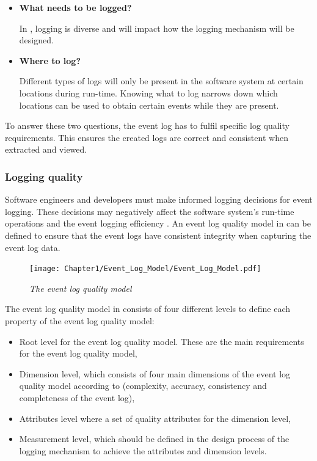 \begin{itemize}
	\item \textbf{What needs to be logged?}\par In , logging is diverse and will impact how the logging mechanism will be designed.
	\item \textbf{Where to log?} \par Different types of logs will only be present in the software system at certain locations during run-time. Knowing what to log narrows down which locations can be used to obtain certain events while they are present.
\end{itemize}

To answer these two questions, the event log has to fulfil specific log quality requirements. This ensures the created logs are correct and consistent when extracted and viewed. 

\clearpage

\subsubsection{Logging quality}\label{sec:ch1_loggingQuality}

Software engineers and developers must make informed logging decisions for event logging. These decisions may negatively affect the software system's run-time operations and the event logging efficiency \cite{Zhu2015, Zhu2019, Kherbouche2017}. An event log quality model in  can be defined to ensure that the event logs have consistent integrity when capturing the event log data.

\begin{figure}[!htb]
	\centering %
	\texttt{[image: Chapter1/Event\_Log\_Model/Event\_Log\_Model.pdf]}
	\caption[The event log quality model]
	{\textit{The event log quality model \cite{Kherbouche2017}}} \label{fig:ch1_EventQModel}
\end{figure}

The event log quality model in  consists of four different levels to define each property of the event log quality model:

\begin{itemize}
	\item Root level for the event log quality model. These are the main requirements for the event log quality model,
	\item Dimension level, which consists of four main dimensions of the event log quality model according to \cite{Kherbouche2017} (complexity, accuracy, consistency and completeness of the event log),
	\item Attributes level where a set of quality attributes for the dimension level,
	\item Measurement level, which should be defined in the design process of the logging mechanism to achieve the attributes and dimension levels.
\end{itemize}

